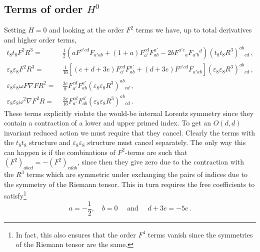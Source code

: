 \documentclass[a4paper,11pt]{article}
\begin{document}
\subsection{Terms of order \texorpdfstring{$H^0$}{H**0}}
Setting $H=0$ and looking at the order $F^2$ terms we have, up to total derivatives and higher order terms,
\begin{equation}
\begin{aligned}
t_8t_8F^2R^3
=&\,
\frac12\left(
aF^{a'cd}F_{a'ab}
+(1+a)F_{a'}^{cd}F^{a'}_{ab}
-2bF^{a'c}{}_aF_{a'b}{}^d
\right)
(t_8t_8R^3)^{ab}{}_{cd}\,,
\\
\varepsilon_8\varepsilon_8F^2R^3
=&\,
\frac{1}{16}\left[(c+d+3e)F_{a'}^{cd}F^{a'}_{ab}+(d+3e)F^{a'cd}F_{a'ab}\right](\varepsilon_8\varepsilon_8R^3)^{ab}{}_{cd}\,,
\\
\varepsilon_8\varepsilon_8\omega F\nabla FR^2
=&\,\frac{3c}{8}F_{a'}^{cd}F^{a'}_{ab}(\varepsilon_8\varepsilon_8R^3)^{ab}{}_{cd}\,,
\\
\varepsilon_8\varepsilon_8\omega^2\nabla F^2R
=&\,
\frac{3c}{16}F_{a'}^{cd}F^{a'}_{ab}(\varepsilon_8\varepsilon_8R^3)^{ab}{}_{cd}\,.
\end{aligned}
\end{equation}
These terms explicitly violate the would-be internal Lorentz symmetry since they contain a contraction of a lower and upper primed index. To get an $O(d,d)$ invariant reduced action we must require that they cancel. Clearly the terms with the $t_8t_8$ structure and $\varepsilon_8\varepsilon_8$ structure must cancel separately. The only way this can happen is if the combinations of $F^2$-terms are such that $(F^2)_{abcd}=-(F^2)_{cdab}$, since then they give zero due to the contraction with the $R^3$ terms which are symmetric under exchanging the pairs of indices due to the symmetry of the Riemann tensor. This in turn requires the free coefficients to satisfy\footnote{In fact, this also ensures that the order $F^4$ terms vanish since the symmetries of the Riemann tensor are the same.}
\begin{equation}
a=-\frac12,\quad b=0\quad\mbox{ and }\quad d+3e=-5c\,.
\end{equation}
\end{document}
